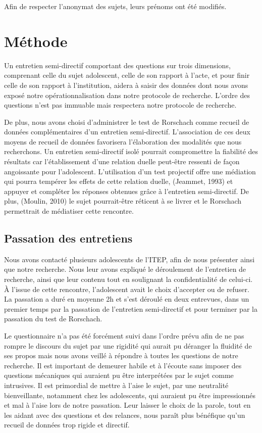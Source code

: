 \documentclass[12pt, a4paper]{book}
\begin{document}
\begin{spacing}{1.5}
Afin de respecter l'anonymat des sujets, leurs prénoms ont été modifiés.
            
\section{Méthode}

Un entretien semi-directif comportant des questions sur trois dimensions, comprenant celle du sujet adolescent, celle de son rapport à l'acte, et pour finir celle de son rapport à l'institution, aidera à saisir des données dont nous avons exposé notre opérationnalisation dans notre protocole de recherche. L'ordre des questions n'est pas immuable  mais respectera notre protocole de recherche.

De plus, nous avons choisi d'administrer le test de Rorschach comme recueil de données complémentaires d'un entretien semi-directif. L'association de ces deux moyens de recueil de données  favorisera l'élaboration des modalités que nous recherchons. Un entretien semi-directif isolé pourrait compromettre la fiabilité des résultats car l'établissement d'une relation duelle peut-être ressenti de façon angoissante pour l'adolescent. L'utilisation d'un test projectif offre une médiation qui pourra tempérer les effets de cette relation duelle, (Jeammet, 1993) et appuyer et compléter les réponses obtenues grâce à l'entretien semi-directif. De plus, (Moulin, 2010) le sujet pourrait-être réticent à se livrer et le Rorschach permettrait de médiatiser cette rencontre.

\subsection{Passation des entretiens}

Nous avons contacté plusieurs adolescents de l'ITEP, afin de nous présenter ainsi que notre recherche. Nous leur avons expliqué le déroulement de l'entretien de recherche, ainsi que leur contenu tout en soulignant la confidentialité de celui-ci. À l'issue de cette rencontre, l'adolescent avait le choix d'accepter ou de refuser. La passation a duré en moyenne 2h et s'est déroulé en deux entrevues, dans un premier temps par la passation de l'entretien semi-directif et pour terminer par la passation du test de Rorschach.

Le questionnaire n'a pas été forcément suivi dans l'ordre prévu afin de ne pas rompre le discours du sujet par une rigidité qui aurait pu déranger la fluidité de ses propos mais nous avons veillé à répondre à toutes les questions de notre recherche. Il est important de demeurer habile et à l'écoute sans imposer des questions mécaniques qui auraient pu être interprétées par le sujet  comme intrusives. Il est primordial de mettre à l'aise le sujet, par une neutralité bienveillante, notamment chez les adolescents, qui auraient pu être impressionnés et mal à l'aise lors de notre passation. Leur laisser le choix de la parole, tout en les aidant avec des questions et des relances, nous paraît plus bénéfique qu'un recueil de données trop rigide et directif.


\end{spacing}
\end{document}
